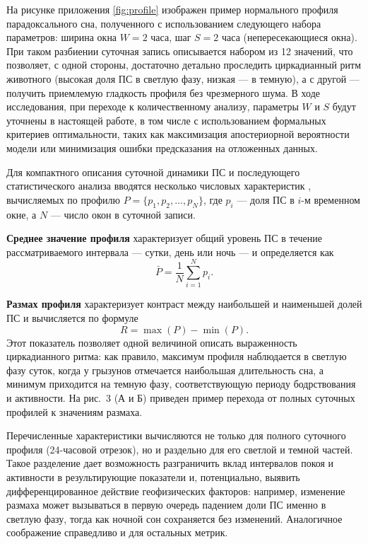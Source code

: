 \documentclass[14pt]{mmcs_article}
\begin{document}
На рисунке приложения \ref{fig:profile} изображен пример нормального профиля парадоксального сна, полученного с использованием следующего набора параметров: ширина окна $W = 2$ часа, шаг $S = 2$ часа (непересекающиеся окна). При таком разбиении суточная запись описывается набором из 12 значений, что позволяет, с одной стороны, достаточно детально проследить циркадианный ритм животного (высокая доля ПС в светлую фазу, низкая — в темную), а с другой — получить приемлемую гладкость профиля без чрезмерного шума. В ходе исследования, при переходе к количественному анализу, параметры $W$ и $S$ будут уточнены в настоящей работе, в том числе с использованием формальных критериев оптимальности, таких как максимизация апостериорной вероятности модели или минимизация ошибки предсказания на отложенных данных.


Для компактного описания суточной динамики ПС и последующего статистического анализа вводятся несколько числовых характеристик \cite{Gmurman2003}, вычисляемых по профилю $P = \{p_1, p_2, \ldots, p_N\}$, где $p_i$ — доля ПС в $i$-м временном окне, а $N$ — число окон в суточной записи.

\textbf{Среднее значение профиля} характеризует общий уровень ПС в течение рассматриваемого интервала --- сутки, день или ночь --- и определяется как
\begin{equation}
	\bar{P} = \frac{1}{N} \sum_{i=1}^{N} p_i.
\end{equation}

\textbf{Размах профиля} характеризует контраст между
наибольшей и наименьшей долей ПС и вычисляется по формуле
\begin{equation}
	R = \max(P) - \min(P).
\end{equation}
Этот показатель позволяет одной величиной описать
выраженность циркадианного ритма: как правило, максимум
профиля наблюдается в светлую фазу суток, когда у грызунов
отмечается наибольшая длительность сна, а минимум приходится
на темную фазу, соответствующую периоду бодрствования и
активности. На рис.~3 (А и Б) приведен пример перехода от
полных суточных профилей к значениям размаха.

Перечисленные характеристики вычисляются не только для
полного суточного профиля (24-часовой отрезок), но и
раздельно для его светлой и темной частей. Такое разделение
дает возможность разграничить вклад интервалов покоя и
активности в результирующие показатели и, потенциально,
выявить дифференцированное действие геофизических факторов:
например, изменение размаха может вызываться в первую очередь
падением доли ПС именно в светлую фазу, тогда как ночной сон
сохраняется без изменений. Аналогичное соображение
справедливо и для остальных метрик.
\end{document}
